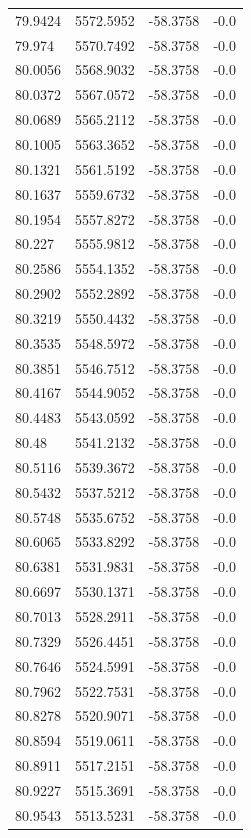 \begin{table}[H]
\begin{tabular}{llll}
79.9424 & 5572.5952 & -58.3758 & -0.0 \\
79.974 & 5570.7492 & -58.3758 & -0.0 \\
80.0056 & 5568.9032 & -58.3758 & -0.0 \\
80.0372 & 5567.0572 & -58.3758 & -0.0 \\
80.0689 & 5565.2112 & -58.3758 & -0.0 \\
80.1005 & 5563.3652 & -58.3758 & -0.0 \\
80.1321 & 5561.5192 & -58.3758 & -0.0 \\
80.1637 & 5559.6732 & -58.3758 & -0.0 \\
80.1954 & 5557.8272 & -58.3758 & -0.0 \\
80.227 & 5555.9812 & -58.3758 & -0.0 \\
80.2586 & 5554.1352 & -58.3758 & -0.0 \\
80.2902 & 5552.2892 & -58.3758 & -0.0 \\
80.3219 & 5550.4432 & -58.3758 & -0.0 \\
80.3535 & 5548.5972 & -58.3758 & -0.0 \\
80.3851 & 5546.7512 & -58.3758 & -0.0 \\
80.4167 & 5544.9052 & -58.3758 & -0.0 \\
80.4483 & 5543.0592 & -58.3758 & -0.0 \\
80.48 & 5541.2132 & -58.3758 & -0.0 \\
80.5116 & 5539.3672 & -58.3758 & -0.0 \\
80.5432 & 5537.5212 & -58.3758 & -0.0 \\
80.5748 & 5535.6752 & -58.3758 & -0.0 \\
80.6065 & 5533.8292 & -58.3758 & -0.0 \\
80.6381 & 5531.9831 & -58.3758 & -0.0 \\
80.6697 & 5530.1371 & -58.3758 & -0.0 \\
80.7013 & 5528.2911 & -58.3758 & -0.0 \\
80.7329 & 5526.4451 & -58.3758 & -0.0 \\
80.7646 & 5524.5991 & -58.3758 & -0.0 \\
80.7962 & 5522.7531 & -58.3758 & -0.0 \\
80.8278 & 5520.9071 & -58.3758 & -0.0 \\
80.8594 & 5519.0611 & -58.3758 & -0.0 \\
80.8911 & 5517.2151 & -58.3758 & -0.0 \\
80.9227 & 5515.3691 & -58.3758 & -0.0 \\
80.9543 & 5513.5231 & -58.3758 & -0.0 \\

\end{tabular}
\end{table}
